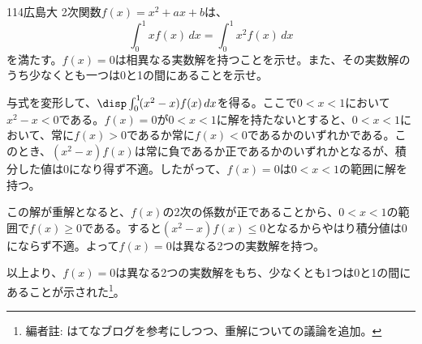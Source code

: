 \begin{prob}{114}{}{広島大}
 2次関数$f(x)=x^2+ax+b$は、
 \[ \int_0^1\! xf(x) \,dx = \int_0^1\! x^2f(x) \,dx \]
 を満たす。$f(x)=0$は相異なる実数解を持つことを示せ。また、その実数解のうち少なくとも一つは0と1の間にあることを示せ。
\end{prob}
与式を変形して、$\disp \int_0^1\!(x^2-x)f(x) \,dx$を得る。ここで$0<x<1$において$x^2-x<0$である。$f(x)=0$が$0<x<1$に解を持たないとすると、$0<x<1$において、常に$f(x)>0$であるか常に$f(x)<0$であるかのいずれかである。このとき、$(x^2-x)f(x)$は常に負であるか正であるかのいずれかとなるが、積分した値は0になり得ず不適。したがって、$f(x)=0$は$0<x<1$の範囲に解を持つ。

この解が重解となると、$f(x)$の2次の係数が正であることから、$0<x<1$の範囲で$f(x)\ge 0$である。すると$(x^2-x)f(x)\le 0$となるからやはり積分値は0にならず不適。よって$f(x)=0$は異なる2つの実数解を持つ。

以上より、$f(x)=0$は異なる2つの実数解をもち、少なくとも1つは0と1の間にあることが示された\footnote{編者註: はてなブログを参考にしつつ、重解についての議論を追加。}。